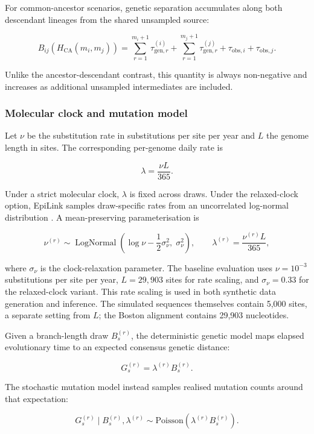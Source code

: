 For common-ancestor scenarios, genetic separation accumulates along both descendant lineages from the shared unsampled source:

\[
	B_{ij}(H_{\mathrm{CA}}(m_i,m_j)) =
	\sum_{r=1}^{m_i+1}\tau_{\mathrm{gen},r}^{(i)}
	+ \sum_{r=1}^{m_j+1}\tau_{\mathrm{gen},r}^{(j)}
	+ \tau_{\mathrm{obs},i} + \tau_{\mathrm{obs},j}.
\]

Unlike the ancestor-descendant contrast, this quantity is always non-negative and increases as additional unsampled intermediates are included.

\subsubsection{Molecular clock and mutation model}

Let $\nu$ be the substitution rate in substitutions per site per year and $L$ the genome length in sites. The corresponding per-genome daily rate is

\[
	\lambda = \frac{\nu L}{365}.
\]

Under a strict molecular clock, $\lambda$ is fixed across draws. Under the relaxed-clock option, EpiLink samples draw-specific rates from an uncorrelated log-normal distribution \citep{Drummond2006}. A mean-preserving parameterisation is

\[
	\nu^{(r)} \sim
	\operatorname{LogNormal}\!\left(
		\log \nu - \frac{1}{2}\sigma_\nu^2,\;
		\sigma_\nu^2
	\right),
	\qquad
	\lambda^{(r)} = \frac{\nu^{(r)} L}{365},
\]

where $\sigma_\nu$ is the clock-relaxation parameter. The baseline evaluation uses $\nu = 10^{-3}$ substitutions per site per year, $L = 29{,}903$ sites for rate scaling, and $\sigma_\nu = 0.33$ for the relaxed-clock variant. This rate scaling is used in both synthetic data generation and inference. The simulated sequences themselves contain 5,000 sites, a separate setting from $L$; the Boston alignment contains 29,903 nucleotides.

Given a branch-length draw $B_s^{(r)}$, the deterministic genetic model maps elapsed evolutionary time to an expected consensus genetic distance:

\[
	G_s^{(r)} = \lambda^{(r)} B_s^{(r)}.
\]

The stochastic mutation model instead samples realised mutation counts around that expectation:

\[
	G_s^{(r)} \mid B_s^{(r)},\lambda^{(r)}
	\sim \mathrm{Poisson}\!\left(\lambda^{(r)} B_s^{(r)}\right).
\]

